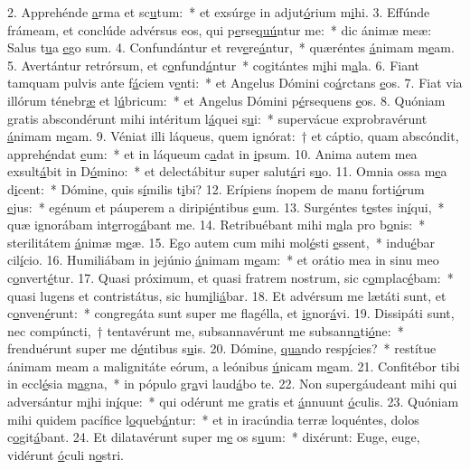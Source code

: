 2. Apprehénde \uline{a}rma et sc\uline{u}tum:~* et exsúrge in adjut\uline{ó}rium m\uline{i}hi.
3. Effúnde frámeam, et conclúde advérsus eos, qui p\uline{e}rse\uline{quú}ntur me:~* dic ánimæ meæ: Salus t\uline{u}a \uline{e}go sum.
4. Confundántur et rev\uline{e}re\uline{á}ntur,~* quæréntes \uline{á}nimam m\uline{e}am.
5. Avertántur retrórsum, et c\uline{o}nfund\uline{á}ntur~* cogitántes m\uline{i}hi m\uline{a}la.
6. Fiant tamquam pulvis ante f\uline{á}ciem v\uline{e}nti:~* et Angelus Dómini co\uline{á}rctans \uline{e}os.
7. Fiat via illórum ténebr\uline{æ} et l\uline{ú}bricum:~* et Angelus Dómini p\uline{é}rsequens \uline{e}os.
8. Quóniam gratis abscondérunt mihi intéritum l\uline{á}quei s\uline{u}i:~* supervácue exprobravérunt \uline{á}nimam m\uline{e}am.
9. Véniat illi láqueus, quem ignórat:~† et cáptio, quam abscóndit, appreh\uline{é}ndat \uline{e}um:~* et in láqueum c\uline{a}dat in \uline{i}psum.
10. Anima autem mea exsult\uline{á}bit in D\uline{ó}mino:~* et delectábitur super salut\uline{á}ri s\uline{u}o.
11. Omnia ossa m\uline{e}a d\uline{i}cent:~* Dómine, quis s\uline{í}milis t\uline{i}bi?
12. Erípiens ínopem de manu forti\uline{ó}rum \uline{e}jus:~* egénum et páuperem a diripi\uline{é}ntibus \uline{e}um.
13. Surgéntes t\uline{e}stes in\uline{í}qui,~* quæ ignorábam int\uline{e}rrog\uline{á}bant me.
14. Retribuébant mihi m\uline{a}la pro b\uline{o}nis:~* sterilitátem \uline{á}nimæ m\uline{e}æ.
15. Ego autem cum mihi mol\uline{é}sti \uline{e}ssent,~* indu\uline{é}bar cil\uline{í}cio.
16. Humiliábam in jejúnio \uline{á}nimam m\uline{e}am:~* et orátio mea in sinu meo c\uline{o}nvert\uline{é}tur.
17. Quasi próximum, et quasi fratrem nostrum, sic c\uline{o}mplac\uline{é}bam:~* quasi lugens et contristátus, sic hum\uline{i}li\uline{á}bar.
18. Et advérsum me lætáti sunt, et c\uline{o}nven\uline{é}runt:~* congregáta sunt super me flagélla, et \uline{i}gnor\uline{á}vi.
19. Dissipáti sunt, nec compúncti,~† tentavérunt me, subsannavérunt me subsann\uline{a}ti\uline{ó}ne:~* frenduérunt super me d\uline{é}ntibus s\uline{u}is.
20. Dómine, \uline{qua}ndo resp\uline{í}cies?~* restítue ánimam meam a malignitáte eórum, a leónibus \uline{ú}nicam m\uline{e}am.
21. Confitébor tibi in eccl\uline{é}sia m\uline{a}gna,~* in pópulo gr\uline{a}vi laud\uline{á}bo te.
22. Non supergáudeant mihi qui adversántur m\uline{i}hi in\uline{í}que:~* qui odérunt me gratis et \uline{á}nnuunt \uline{ó}culis.
23. Quóniam mihi quidem pacífice l\uline{o}queb\uline{á}ntur:~* et in iracúndia terræ loquéntes, dolos c\uline{o}git\uline{á}bant.
24. Et dilatavérunt super m\uline{e} os s\uline{u}um:~* dixérunt: Euge, euge, vidérunt \uline{ó}culi n\uline{o}stri.
